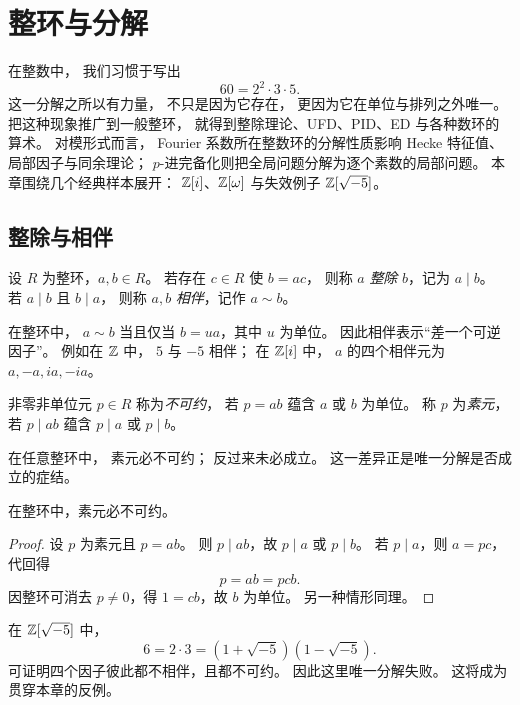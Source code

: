 \chapter{整环与分解}

在整数中，
我们习惯于写出
\[
60=2^2\cdot 3\cdot 5.
\]
这一分解之所以有力量，
不只是因为它存在，
更因为它在单位与排列之外唯一。
把这种现象推广到一般整环，
就得到整除理论、UFD、PID、ED 与各种数环的算术。
对模形式而言，
Fourier 系数所在整数环的分解性质影响 Hecke 特征值、局部因子与同余理论；
$p$-进完备化则把全局问题分解为逐个素数的局部问题。
本章围绕几个经典样本展开：
$\mathbb{Z}[i]$、$\mathbb{Z}[\omega]$ 与失效例子 $\mathbb{Z}[\sqrt{-5}]$。

\section{整除与相伴}

\begin{definition}
设 $R$ 为整环，$a,b\in R$。
若存在 $c\in R$ 使 $b=ac$，
则称 $a$ \emph{整除} $b$，记为 $a\mid b$。
若 $a\mid b$ 且 $b\mid a$，
则称 $a,b$ \emph{相伴}，记作 $a\sim b$。
\end{definition}

在整环中，
$a\sim b$ 当且仅当 $b=ua$，其中 $u$ 为单位。
因此相伴表示“差一个可逆因子”。
例如在 $\mathbb{Z}$ 中，
$5$ 与 $-5$ 相伴；
在 $\mathbb{Z}[i]$ 中，
$a$ 的四个相伴元为 $a,-a,ia,-ia$。

\begin{definition}
非零非单位元 $p\in R$ 称为\emph{不可约}，
若 $p=ab$ 蕴含 $a$ 或 $b$ 为单位。
称 $p$ 为\emph{素元}，
若 $p\mid ab$ 蕴含 $p\mid a$ 或 $p\mid b$。
\end{definition}

在任意整环中，
素元必不可约；
反过来未必成立。
这一差异正是唯一分解是否成立的症结。

\begin{proposition}
在整环中，素元必不可约。
\end{proposition}

\begin{proof}
设 $p$ 为素元且 $p=ab$。
则 $p\mid ab$，故 $p\mid a$ 或 $p\mid b$。
若 $p\mid a$，则 $a=pc$，代回得
\[
p=ab=pcb.
\]
因整环可消去 $p\ne0$，得 $1=cb$，故 $b$ 为单位。
另一种情形同理。
\end{proof}

\begin{example}
在 $\mathbb{Z}[\sqrt{-5}]$ 中，
\[
6=2\cdot 3=(1+\sqrt{-5})(1-\sqrt{-5}).
\]
可证明四个因子彼此都不相伴，且都不可约。
因此这里唯一分解失败。
这将成为贯穿本章的反例。
\end{example}

